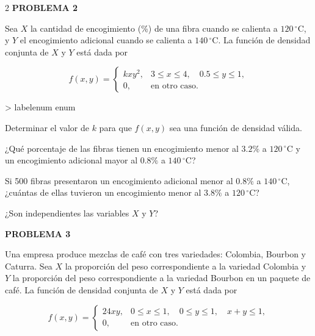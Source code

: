 \documentclass[10pt,letterpaper]{article}
\makeatletter
\renewenvironment{enumerate}
  {\ifnum \@enumdepth >\thr@@\@toodeep\else
   \advance\@enumdepth\@ne
   \edef\@enumctr{enum\romannumeral\the\@enumdepth}%
   \expandafter\list\csname label\@enumctr\endcsname
     {\usecounter\@enumctr
      \setlength{\topsep}{3pt}%
      \setlength{\itemsep}{2pt}%
      \setlength{\parsep}{0pt}%
      \setlength{\partopsep}{0pt}%
      \setlength{\leftmargin}{1.6em}%
      \setlength{\labelsep}{0.4em}}%
   \fi}
  {\endlist}
\newcommand{\problema}[1]{%
  \vspace{2pt}
  \noindent\textbf{\large PROBLEMA #1}\par
  \vspace{2pt}
}
\makeatother
\begin{document}
\begin{multicols}{2}
\problema{2}

Sea \(X\) la cantidad de encogimiento (\%) de una fibra cuando se calienta a
\(120\,^{\circ}\mathrm{C}\), y \(Y\) el encogimiento adicional cuando se
calienta a \(140\,^{\circ}\mathrm{C}\). La función de densidad conjunta de
\(X\) y \(Y\) está dada por

\[
f(x,y)=
\begin{cases}
kxy^2, & 3\leq x\leq4,\quad 0.5\leq y\leq1,\\
0, & \text{en otro caso}.
\end{cases}
\]

\begin{enumerate}
\item Determinar el valor de \(k\) para que \(f(x,y)\) sea una función de
densidad válida.
\item ¿Qué porcentaje de las fibras tienen un encogimiento menor al \(3.2\%\)
a \(120\,^{\circ}\mathrm{C}\) y un encogimiento adicional mayor al \(0.8\%\)
a \(140\,^{\circ}\mathrm{C}\)?
\item Si 500 fibras presentaron un encogimiento adicional menor al \(0.8\%\)
a \(140\,^{\circ}\mathrm{C}\), ¿cuántas de ellas tuvieron un encogimiento
menor al \(3.8\%\) a \(120\,^{\circ}\mathrm{C}\)?
\item ¿Son independientes las variables \(X\) y \(Y\)?
\end{enumerate}

\problema{3}

Una empresa produce mezclas de café con tres variedades: Colombia, Bourbon y
Caturra. Sea \(X\) la proporción del peso correspondiente a la variedad
Colombia y \(Y\) la proporción del peso correspondiente a la variedad Bourbon
en un paquete de café. La función de densidad conjunta de \(X\) y \(Y\) está
dada por

\[
f(x,y)=
\begin{cases}
24xy, & 0\leq x\leq1,\quad 0\leq y\leq1,\quad x+y\leq1,\\
0, & \text{en otro caso}.
\end{cases}
\]


\end{multicols}
\end{document}
